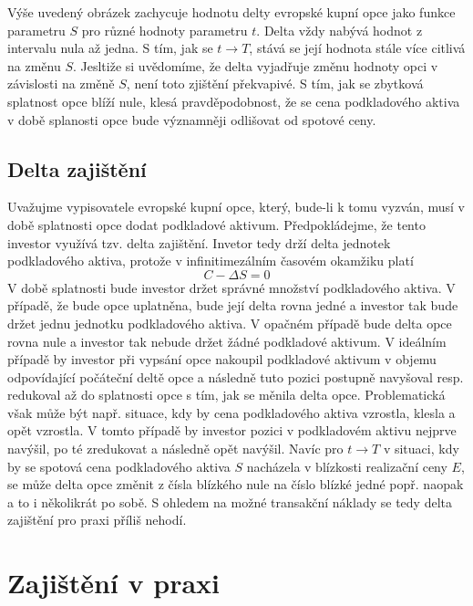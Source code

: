 \documentclass[a4paper]{book}
\begin{document}
Výše uvedený obrázek zachycuje hodnotu delty evropské kupní opce jako funkce parametru $S$ pro různé hodnoty parametru $t$. Delta vždy nabývá hodnot z intervalu nula až jedna. S tím, jak se $t \rightarrow T$, stává se její hodnota stále více citlivá na změnu $S$. Jesltiže si uvědomíme, že delta vyjadřuje změnu hodnoty opci v závislosti na změně $S$, není toto zjištění překvapivé. S tím, jak se zbytková splatnost opce blíží nule, klesá pravděpodobnost, že se cena podkladového aktiva v době splanosti opce bude významněji odlišovat od spotové ceny.

\subsection{Delta zajištění}

Uvažujme vypisovatele evropské kupní opce, který, bude-li k tomu vyzván, musí v době splatnosti opce dodat podkladové aktivum. Předpokládejme, že tento investor využívá tzv. delta zajištění. Invetor tedy drží delta jednotek podkladového aktiva, protože v infinitimezálním časovém okamžiku platí
\begin{equation*}
 C - \Delta S = 0
\end{equation*}
V době splatnosti bude investor držet správné množství podkladového aktiva. V případě, že bude opce uplatněna, bude její delta rovna jedné a investor tak bude držet jednu jednotku podkladového aktiva. V opačném případě bude delta opce rovna nule a investor tak nebude držet žádné podkladové aktivum. V ideálním případě by investor při vypsání opce nakoupil podkladové aktivum v objemu odpovídající počáteční deltě opce a následně tuto pozici postupně navyšoval resp. redukoval až do splatnosti opce s tím, jak se měnila delta opce. Problematická však může být např. situace, kdy by cena podkladového aktiva vzrostla, klesla a opět vzrostla. V tomto případě by investor pozici v podkladovém aktivu nejprve navýšil, po té zredukovat a následně opět navýšil. Navíc pro $t \rightarrow T$ v situaci, kdy by se spotová cena podkladového aktiva $S$ nacházela v  blízkosti realizační ceny $E$, se může delta opce změnit z čísla blízkého nule na číslo blízké jedné popř. naopak a to i několikrát po sobě. S ohledem na možné transakční náklady se tedy delta zajištění pro praxi příliš nehodí.

\section{Zajištění v praxi}
\end{document}
